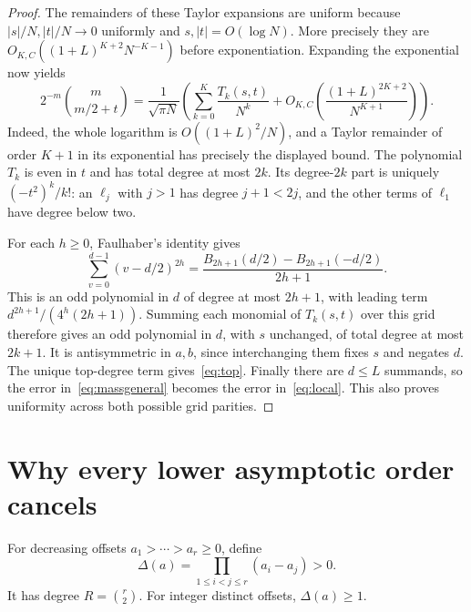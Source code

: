 \documentclass[11pt]{article}
\theoremstyle{remark}
\begin{document}
\begin{proof}
The remainders of these Taylor expansions are uniform because
$|s|/N,|t|/N\to0$ uniformly and $s,|t|=O(\log N)$. More precisely they are
$O_{K,C}((1+L)^{K+2}N^{-K-1})$ before exponentiation. Expanding the exponential
now yields
\begin{equation}\label{eq:massgeneral}
 2^{-m}\binom m{m/2+t}=
 \frac1{\sqrt{\pi N}}\left(
  \sum_{k=0}^K\frac{T_k(s,t)}{N^k}
  +O_{K,C}\left(\frac{(1+L)^{2K+2}}{N^{K+1}}\right)\right).
\end{equation}
Indeed, the whole logarithm is $O((1+L)^2/N)$, and a Taylor remainder of
order $K+1$ in its exponential has precisely the displayed bound.
The polynomial $T_k$ is even in $t$ and has total degree at most $2k$.
Its degree-$2k$ part is uniquely $(-t^2)^k/k!$: an $\ell_j$ with $j>1$
has degree $j+1<2j$, and the other terms of $\ell_1$ have degree below two.

For each $h\ge0$, Faulhaber's identity gives
\begin{equation}\label{eq:Faulhaber}
 \sum_{v=0}^{d-1}(v-d/2)^{2h}
 =\frac{B_{2h+1}(d/2)-B_{2h+1}(-d/2)}{2h+1}.
\end{equation}
This is an odd polynomial in $d$ of degree at most $2h+1$, with leading term
$d^{2h+1}/(4^h(2h+1))$. Summing each monomial of $T_k(s,t)$ over this grid
therefore gives an odd polynomial in $d$, with $s$ unchanged, of total degree
at most $2k+1$. It is antisymmetric in $a,b$, since interchanging them fixes
$s$ and negates $d$. The unique top-degree term gives~\eqref{eq:top}.
Finally there are $d\le L$ summands, so the error in~\eqref{eq:massgeneral}
becomes the error in~\eqref{eq:local}. This also proves uniformity across both
possible grid parities.
\end{proof}

\section{Why every lower asymptotic order cancels}

For decreasing offsets $a_1>\cdots>a_r\ge0$, define
\[
 \Delta(a)=\prod_{1\le i<j\le r}(a_i-a_j)>0.
\]
It has degree $R=\binom r2$. For integer distinct offsets, $\Delta(a)\ge1$.
\end{document}
